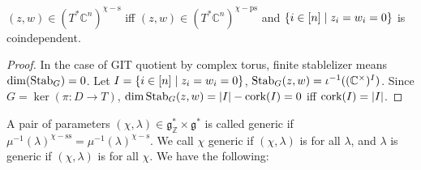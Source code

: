 \documentclass[b5paper]{article}
\newcommand{\sstab}{\mathrm{ss}}
\newcommand{\pstab}{\mathrm{ps}}
\newcommand{\stab}{\mathrm{s}}
\newcommand{\cork}{\textnormal{cork}}
\begin{document}
\begin{proposition}{}
  $(z,w)\in (T^*\mathbb{C}^n)^{\chi-\stab}$ iff $(z,w)\in (T^*\mathbb{C}^n)^{\chi-\pstab}$ and $\left\{i\in [n]\mid z_i=w_i=0\right\}$ is coindependent.
  \begin{proof}
      In the case of GIT quotient by complex torus, finite stablelizer means $\dim(\textnormal{Stab}_G)=0$. Let $I=\left\{i\in [n] \mid z_i=w_i=0\right\}$, $\textnormal{Stab}_G(z,w)=\iota^{-1}((\mathbb{C}^\times )^I)$. Since $G=\ker(\pi:D\rightarrow T)$, $\dim\textnormal{Stab}_G(z,w)=|I|-\cork(I)=0$ iff $\cork(I)=|I|$.
  \end{proof}
\end{proposition}

A pair of parameters $(\chi,\lambda)\in \mathfrak{g}^*_{\mathbb{Z}}\times \mathfrak{g}^*$ is called generic if $\mu^{-1}(\lambda)^{\chi-\sstab}=\mu^{-1}(\lambda)^{\chi-\stab}$. We call $\chi$ generic if $(\chi,\lambda)$ is for all $\lambda$, and $\lambda$ is generic if $(\chi,\lambda)$ is for all $\chi$. We have the following:
\end{document}

